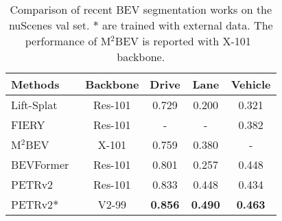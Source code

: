 \documentclass[10pt,twocolumn,letterpaper]{article}
\begin{document}
\begin{table}[t]
\begin{center}
\caption{Comparison of recent BEV segmentation works on the nuScenes val set. $\ast$ are trained with external data. The performance of M$^{2}$BEV is reported with X-101~\cite{xie2017aggregated} backbone.}
\label{seg_compare}
\setlength{\tabcolsep}{5pt}
\begin{tabular}{l|c|ccc}
\hline
Methods & Backbone  & Drive & Lane & Vehicle  \\
\hline
Lift-Splat~\cite{philion2020lift} & Res-101&0.729 &0.200 &0.321   \\
FIERY~\cite{hu2021fiery} & Res-101& - &- &0.382 \\
M$^{2}$BEV~\cite{xie2022m} & X-101&0.759 &0.380 &- \\
BEVFormer~\cite{li2022bevformer} & Res-101& 0.801 &0.257 &0.448 \\
\hline

PETRv2 & Res-101  &0.833 &0.448 &0.434   \\


PETRv2$\ast$ & V2-99  &\textbf{0.856} &\textbf{0.490} &\textbf{0.463}   \\


\hline
\end{tabular}
\end{center}
\vspace{-1.5em}
\end{table}
\end{document}
